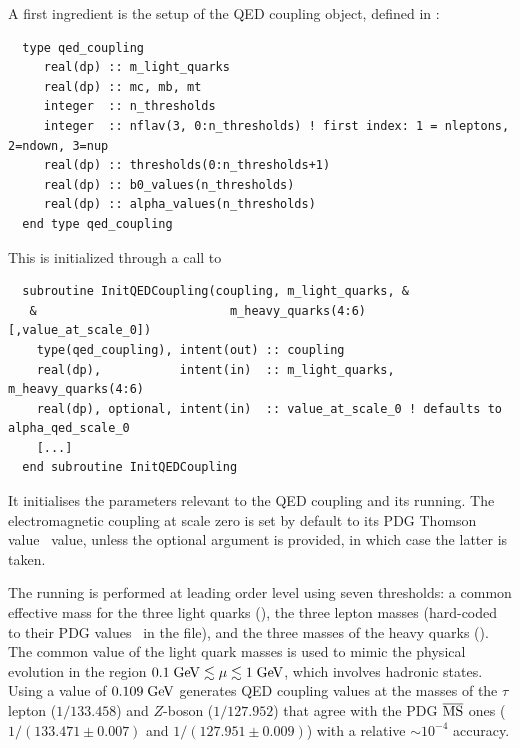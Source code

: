 A first ingredient is the setup of the QED coupling object, defined in
:
\begin{lstlisting}
  type qed_coupling 
     real(dp) :: m_light_quarks
     real(dp) :: mc, mb, mt
     integer  :: n_thresholds
     integer  :: nflav(3, 0:n_thresholds) ! first index: 1 = nleptons, 2=ndown, 3=nup
     real(dp) :: thresholds(0:n_thresholds+1)
     real(dp) :: b0_values(n_thresholds)
     real(dp) :: alpha_values(n_thresholds)
  end type qed_coupling
\end{lstlisting}
%
This is initialized through a call to 
\begin{lstlisting}
  subroutine InitQEDCoupling(coupling, m_light_quarks, &
   &                           m_heavy_quarks(4:6) [,value_at_scale_0])
    type(qed_coupling), intent(out) :: coupling
    real(dp),           intent(in)  :: m_light_quarks, m_heavy_quarks(4:6)
    real(dp), optional, intent(in)  :: value_at_scale_0 ! defaults to alpha_qed_scale_0
    [...]
  end subroutine InitQEDCoupling
\end{lstlisting}
%
It initialises the parameters relevant to the QED coupling and its
running.  The electromagnetic coupling at scale zero is set by default
to its PDG Thomson value~\cite{ParticleDataGroup:2022pth} value, unless the optional
argument  is provided, in which case the
latter is taken.

The running is performed at leading order level using seven
thresholds: a common effective mass for the three light quarks
(), the three lepton masses (hard-coded to their
PDG values~\cite{ParticleDataGroup:2022pth} in the
 file), and the three masses of the heavy
quarks ().
%
The common value of the light quark masses is used to mimic the
physical evolution in the region $0.1\;\mathrm{GeV} \lesssim \mu \lesssim
1\;\mathrm{GeV}$, which involves hadronic states.
%
Using a value of $0.109\;\mathrm{GeV}$ generates QED coupling values at
the masses of the $\tau$ lepton ($1/133.458$) and $Z$-boson ($1/127.952$) that
agree with the PDG $\overline{\mathrm{MS}}$  ones ($1/(133.471\pm0.007)$ and $1/(127.951\pm0.009)$)
with a relative $\sim 10^{-4}$ accuracy.
% 
%

